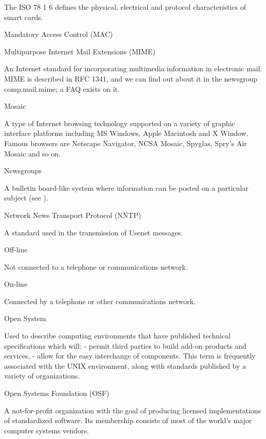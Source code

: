 \begin{htmllist}
The ISO 78 1 6 defines the physical, electrical and protocol
characteristics of smart cards.


\item[Mandatory Access Control (MAC)]


\item[Multipurpose Internet Mail Extensions (MIME)]

An Internet standard for incorporating multimedia information in
electronic mail. MIME is described in RFC 1341, and we can find out
about it in the newsgroup comp.mail.mime; a FAQ exists on it.


\item[Mosaic]

A type of Internet browsing technology supported on a variety of
graphic interface platforms including MS Windows, Apple Macintosh and X
Window. Famous browsers are Netscape Navigator, NCSA Mosaic, Spyglas,
Spry's Air Mosaic and so on.


\item[Newsgroups]

A bulletin board-like system where information can be posted on a
particular subject (see ).


\item[Network News Transport Protocol (NNTP)]

A standard used in the transmission of Usenet messages.


\item[Off-line]

Not connected to a telephone or communications network.


\item[On-line]

Connected by a telephone or other communications network.


\item[Open System]

Used to describe computing environments that have published technical
specifications which will:
  - permit third parties to build add-on products and services,
  - allow for the easy interchange of components. This term is
frequently associated with the UNIX environment, along with standards
published by a variety of organizations.

\item[Open Systems Foundation (OSF)]

A not-for-profit organization with the goal of producing licensed
implementations of standardized software. Its membership consists of
most of the world's major computer systems vendors.



\end{htmllist}

